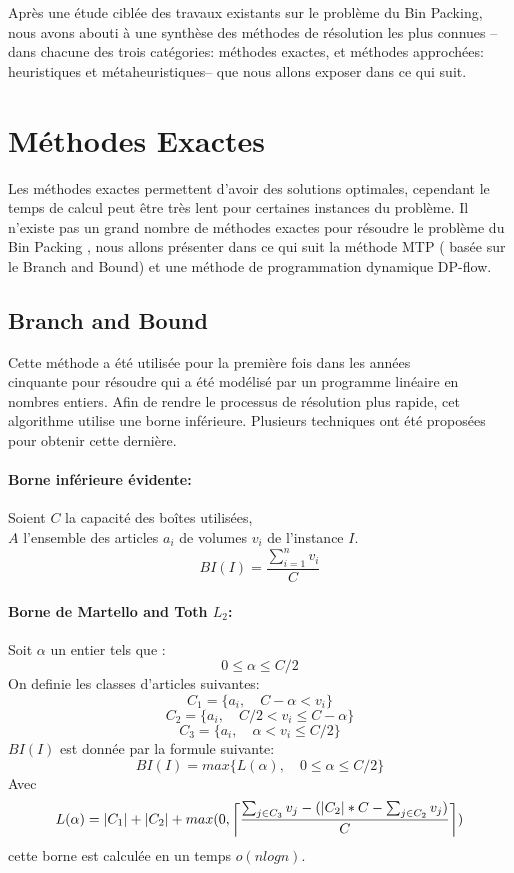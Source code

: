 \documentclass[class=report, crop=false]{standalone}
\DeclarePairedDelimiter\ceil{\lceil}{\rceil}
\begin{document}
\setcounter{section}{0}
    Après une étude ciblée des travaux existants sur le problème du Bin Packing, nous avons abouti à une synthèse des méthodes de résolution les plus connues --dans chacune des trois catégories: méthodes exactes, et méthodes approchées: heuristiques et métaheuristiques-- que nous allons exposer dans ce qui suit. 
    \section{Méthodes Exactes}
    Les méthodes exactes permettent d’avoir des solutions optimales, cependant le temps de calcul peut être très lent pour certaines instances du problème. Il n’existe pas un grand nombre de méthodes exactes pour résoudre le problème du Bin Packing , nous allons présenter dans ce qui suit la méthode  MTP ( basée sur le Branch and Bound) et une méthode de programmation dynamique DP-flow.
    \subsection{Branch and Bound}
    Cette méthode a été utilisée pour la première fois dans les années \\ cinquante pour résoudre qui a été  modélisé par un programme linéaire en nombres entiers.
Afin de rendre le processus de résolution plus rapide, cet algorithme utilise une borne inférieure. Plusieurs techniques ont été proposées pour obtenir cette dernière.
    \paragraph{Borne inférieure évidente:} Soient \(C\) la capacité des boîtes utilisées,\\
     \(A\) l’ensemble des articles \(a_i\) de volumes \(v_i\) de l’instance \(I\).
        \[BI(I)=\frac{\displaystyle\sum_{i=1}^{n} v_i}{C}\]
    \paragraph{Borne de Martello and Toth \(L_2\):\cite{martello1990lower}}  
    Soit \(\alpha\) un entier tels que :
    \[0 \le \alpha \le C/2\]
    On definie les classes d'articles suivantes: 
    \[C_1 = \{a_i, \quad C-\alpha < v_i\} \]
    \[C_2 = \{a_i, \quad C/2 < v_i \le C-\alpha\} \]
    \[C_3 = \{a_i, \quad \alpha < v_i \le C/2\} \]
    \(BI(I)\)  est donnée par la formule suivante:
    \[BI(I)=max\{L(\alpha),\quad 0 \le \alpha \le C/2\}\]
    Avec
    \[L(\alpha)=|C_1|+|C_2|+max(0, \ceil*{\frac{\sum_{j \in C_3}^{} v_j - (|C_2|*C - \sum_{j \in C_2}^{} v_j) }{C}})\]
    cette borne est calculée en un temps \(o(nlogn)\).
\end{document}
